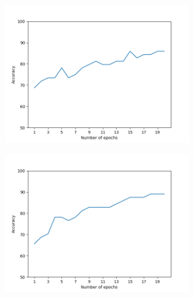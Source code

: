 \documentclass[12pt]{article}
\begin{document}
\begin{figure}
	\begin{subfigure}{0.6\textwidth}
		\includegraphics[width = 0.9\textwidth]{ex3_FCNN1l_accuracy-epochs.png}
		\caption{}
		\label{subfig:FCNN1l_accuracy-epochs}
	\end{subfigure}
	\begin{subfigure}{0.6\textwidth}
		\includegraphics[width = 0.9\textwidth]{ex3_FCNN2l_accuracy-epochs.png}
		\caption{}
		\label{subfig:FCNN2l_accuracy-epochs}
	\end{subfigure}
	\caption{}
	\label{fig:ex3_FCNN_epochs}
\end{figure}
\end{document}

